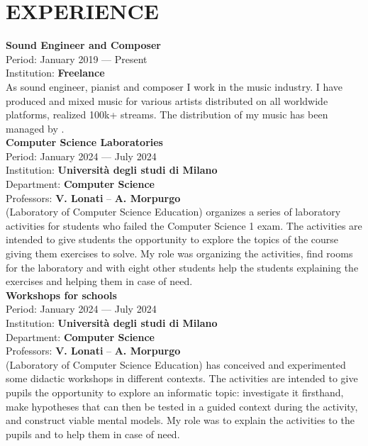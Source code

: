 \documentclass[a4paper,9pt]{extarticle}
\begin{document}

\section*{EXPERIENCE}

\noindent
\newline
\textbf{Sound Engineer and Composer} \\
Period: January 2019 --- Present \\
Institution: \textbf{Freelance} \\
As sound engineer, pianist and composer I work in the music industry. I have produced and mixed music for various artists distributed on all worldwide platforms, realized 100k+ streams. The distribution of my music has been managed by \believe. \\

\noindent
\textbf{Computer Science Laboratories} \\
Period: January 2024 --- July 2024 \\
Institution: \textbf{Universit\`a degli studi di Milano} \\
Department: \textbf{Computer Science} \\
Professors: \textbf{V. Lonati} -- \textbf{A. Morpurgo} \\
\aladdin (Laboratory of Computer Science Education) organizes a series of laboratory activities for students who failed the Computer Science 1 exam. The activities are intended to give students the opportunity to explore the topics of the course giving them exercises to solve.
My role was organizing the activities, find rooms for the laboratory and with eight other students help the students explaining the exercises and helping them in case of need. \\

\noindent
\textbf{Workshops for schools} \\
Period: January 2024 --- July 2024 \\
Institution: \textbf{Universit\`a degli studi di Milano} \\
Department: \textbf{Computer Science} \\
Professors: \textbf{V. Lonati} -- \textbf{A. Morpurgo} \\
\aladdin (Laboratory of Computer Science Education) has conceived and experimented some didactic workshops in different contexts.  The activities are intended to give pupils the opportunity to explore an informatic topic: investigate it firsthand, make hypotheses that can then be tested in a guided context during the activity, and construct viable mental models. My role was to explain the activities to the pupils and to help them in case of need. \\
\end{document}
